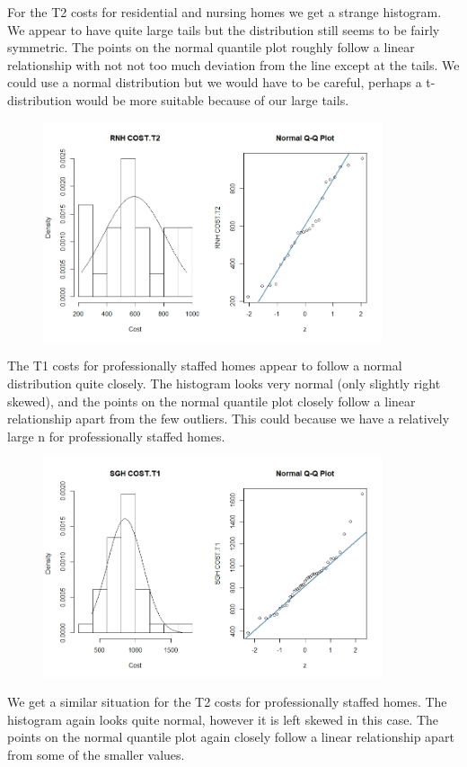 \documentclass[]{article}
\begin{document}
For the T2 costs for residential and nursing homes we get a strange histogram. We appear to have quite large tails but the distribution still seems to be fairly symmetric. The points on the normal quantile plot roughly follow a linear relationship with not not too much deviation from the line except at the tails. We could use a normal distribution but we would have to be careful, perhaps a t-distribution would be more suitable because of our large tails.
\begin{figure}[H]
\centering
\includegraphics[width=10cm]{RStudio/jpeg/Norm_RNH_T2.jpeg}
\end{figure}
The T1 costs for professionally staffed homes appear to follow a normal distribution quite closely. The histogram looks very normal (only slightly right skewed), and the points on the normal quantile plot closely follow a linear relationship apart from the few outliers. This could because we have a relatively large n for professionally staffed homes.
\begin{figure}[H]
\centering
\includegraphics[width=10cm]{RStudio/jpeg/Norm_SGH_T1.jpeg}
\end{figure}
We get a similar situation for the T2 costs for professionally staffed homes. The histogram again looks quite normal, however it is left skewed in this case. The points on the normal quantile plot again closely follow a linear relationship apart from some of the smaller values.
\end{document}
